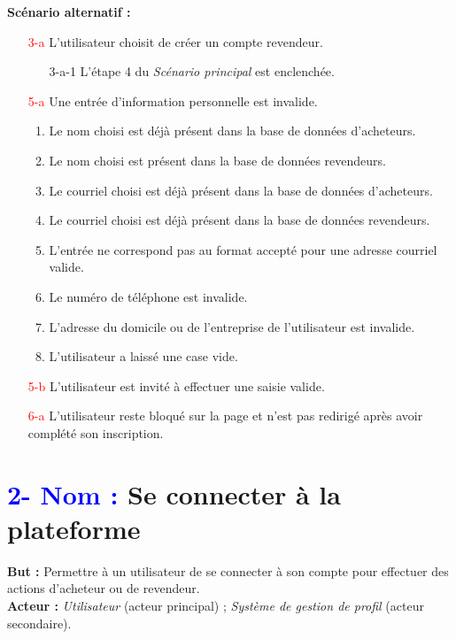 \documentclass[16pt]{report}
\begin{document}
\textbf{Scénario alternatif :}
\begin{enumerate}[leftmargin=4em]
    \item[\textcolor{red}{3-a}] L'utilisateur choisit de créer un compte revendeur.
            \begin{enumerate}[leftmargin=4em]
                \item[3-a-1] L'étape 4 du \textit{Scénario principal} est enclenchée.   
            \end{enumerate}
    \item[\textcolor{red}{5-a}] Une entrée d'information personnelle est invalide.
    \begin{enumerate}[leftmargin=4em]
        \item Le nom choisi est déjà présent dans la base de données d'acheteurs.
        \item Le nom choisi est présent dans la base de données revendeurs.
        \item Le courriel choisi est déjà présent dans la base de données d'acheteurs.
        \item Le courriel choisi est déjà présent dans la base de données revendeurs.
        \item L'entrée ne correspond pas au format accepté pour une adresse courriel valide.
        \item Le numéro de téléphone est invalide.
        \item L'adresse du domicile ou de l'entreprise de l'utilisateur est invalide.
        \item L'utilisateur a laissé une case vide.
    \end{enumerate}
    \item[\textcolor{red}{5-b}] L'utilisateur est invité à effectuer une saisie valide.
    \item[\textcolor{red}{6-a}] L'utilisateur reste bloqué sur la page et n'est pas redirigé après avoir complété son inscription.
\end{enumerate}

\section*{\textbf{\textcolor{blue}{2- Nom :}} Se connecter à la plateforme}
\textbf{But :} Permettre à un utilisateur de se connecter à son compte pour effectuer des actions d'acheteur ou de revendeur. \\
\textbf{Acteur :} \textit{Utilisateur} (acteur principal) ; \textit{Système de gestion de profil} (acteur secondaire).
\end{document}
